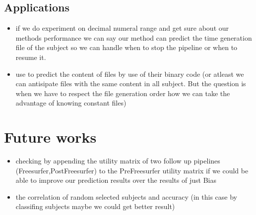 \subsection{Applications}
\begin{tcolorbox}
	\begin{itemize}
		\item if we do experiment on decimal numeral range and get sure about our methods 
		performance we can say our method can predict the time generation file of the subject 
		so we can handle when to stop the pipeline or when to resume it.
		\item use to predict the content of files by use of their binary code 
		(or atleast we can antisipate files with the same content in all subject. 
		But the question is when we have to respect the file generation order how we can take the advantage of knowing constant files)
\end{itemize}
\end{tcolorbox}
\section{Future works}
\begin{tcolorbox}
	\begin{itemize}
		\item checking by appending the utility matrix of two follow up pipelines (Freesurfer,PostFreesurfer) 
		to the PreFreesurfer utility matrix if we could be able to improve our prediction results over the results 
		of just Bias
		\item the correlation of random selected subjects and accuracy (in this case by classifing subjects maybe we could get better result)

\end{itemize}
\end{tcolorbox}
